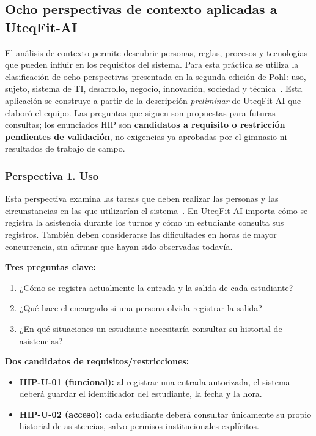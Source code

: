 \subsection{Ocho perspectivas de contexto aplicadas a UteqFit-AI}
\label{sec:ocho-perspectivas}

El análisis de contexto permite descubrir personas, reglas, procesos y tecnologías que pueden influir en los requisitos del sistema. Para esta práctica se utiliza la clasificación de ocho perspectivas presentada en la segunda edición de Pohl: uso, sujeto, sistema de TI, desarrollo, negocio, innovación, sociedad y técnica~\cite{pohl2025}. Esta aplicación se construye a partir de la descripción \emph{preliminar} de UteqFit-AI que elaboró el equipo. Las preguntas que siguen son propuestas para futuras consultas; los enunciados HIP son \textbf{candidatos a requisito o restricción pendientes de validación}, no exigencias ya aprobadas por el gimnasio ni resultados de trabajo de campo.

\subsubsection{Perspectiva 1. Uso}
Esta perspectiva examina las tareas que deben realizar las personas y las circunstancias en las que utilizarían el sistema~\cite{pohl2025}. En UteqFit-AI importa cómo se registra la asistencia durante los turnos y cómo un estudiante consulta sus registros. También deben considerarse las dificultades en horas de mayor concurrencia, sin afirmar que hayan sido observadas todavía.

\textbf{Tres preguntas clave:}
\begin{enumerate}
\item ¿Cómo se registra actualmente la entrada y la salida de cada estudiante?
\item ¿Qué hace el encargado si una persona olvida registrar la salida?
\item ¿En qué situaciones un estudiante necesitaría consultar su historial de asistencias?
\end{enumerate}
\textbf{Dos candidatos de requisitos/restricciones:}
\begin{itemize}
\item \textbf{HIP-U-01 (funcional):} al registrar una entrada autorizada, el sistema deberá guardar el identificador del estudiante, la fecha y la hora.
\item \textbf{HIP-U-02 (acceso):} cada estudiante deberá consultar únicamente su propio historial de asistencias, salvo permisos institucionales explícitos.
\end{itemize}

